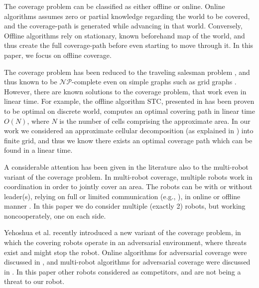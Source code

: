 \documentclass[a4paper,english,10pt]{article}
\begin{document}
The coverage problem can be classified as either offline or online. 
Online algorithms assumes zero or partial knowledge regarding the world to be covered, and the coverage-path is generated while advancing in that world. Conversely, Offline algorithms rely on stationary, known beforehand map of the world, and thus create the full coverage-path before even starting to move through it. In this paper, we focus on offline coverage.

The coverage problem has been reduced to the traveling salesman problem \cite{arkin2000approximation}, and thus known to be $\mathcal{NP}$-complete even on simple graphs such as grid graphs \cite{papadimitriou1977euclidean}. However, there are known solutions to the coverage problem, that work even in linear time. For example, the offline algorithm STC, presented in \cite{gabriely2001spanning} has been proven to be optimal on discrete world, computes an optimal covering path in linear time $O(N)$, where $N$ is the number of cells comprising the approximate area. In our work we considered an approximate cellular decomposition (as explained in \cite{galceran2013survey}) into finite grid, and thus we know there exists an optimal coverage path which can be found in a linear time.

A considerable attention has been given in the literature also to the multi-robot variant of the coverage problem. In multi-robot coverage, multiple robots work in coordination in order to jointly cover an area. The robots can be with or without leader(s), relying on full or limited communication (e.g., \cite{agmon2008giving}), in online or offline manner \cite{agmon2008giving, de2005blind}.
In this paper we do consider multiple (exactly 2) robots, but working noncooperately, one on each side.

Yehoshua et al. \cite{yehoshua2013robotic} recently introduced a new variant of the coverage problem, in which the covering robots operate in an adversarial environment, where threats exist and might stop the robot. Online algorithms for adversarial coverage were discussed in  \cite{yehoshua2015online}, and multi-robot algorithms for adversarial coverage were discussed in \cite{yehoshua2016multi}.
In this paper other robots considered as competitors, and are not being a threat to our robot. %
\end{document}
